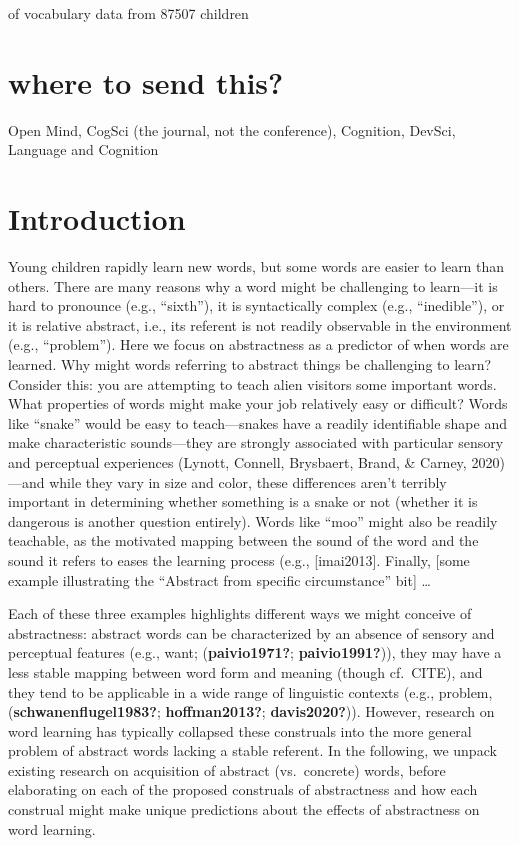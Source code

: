 \documentclass[
  man,floatsintext]{apa6}
\begin{document}
of vocabulary data from 87507 children

\hypertarget{where-to-send-this}{%
\section{where to send this?}\label{where-to-send-this}}

Open Mind, CogSci (the journal, not the conference), Cognition, DevSci, Language and Cognition

\hypertarget{introduction}{%
\section{Introduction}\label{introduction}}

Young children rapidly learn new words, but some words are easier to learn than others. There are many reasons why a word might be challenging to learn---it is hard to pronounce (e.g., ``sixth''), it is syntactically complex (e.g., ``inedible''), or it is relative abstract, i.e., its referent is not readily observable in the environment (e.g., ``problem''). Here we focus on abstractness as a predictor of when words are learned. Why might words referring to abstract things be challenging to learn? Consider this: you are attempting to teach alien visitors some important words. What properties of words might make your job relatively easy or difficult? Words like ``snake'' would be easy to teach---snakes have a readily identifiable shape and make characteristic sounds---they are strongly associated with particular sensory and perceptual experiences (Lynott, Connell, Brysbaert, Brand, \& Carney, 2020)---and while they vary in size and color, these differences aren't terribly important in determining whether something is a snake or not (whether it is dangerous is another question entirely). Words like ``moo'' might also be readily teachable, as the motivated mapping between the sound of the word and the sound it refers to eases the learning process (e.g., {[}imai2013{]}. Finally, {[}some example illustrating the ``Abstract from specific circumstance'' bit{]} \ldots{}

Each of these three examples highlights different ways we might conceive of abstractness: abstract words can be characterized by an absence of sensory and perceptual features (e.g., want; (\textbf{paivio1971?}; \textbf{paivio1991?})), they may have a less stable mapping between word form and meaning (though cf.~CITE), and they tend to be applicable in a wide range of linguistic contexts (e.g., problem, (\textbf{schwanenflugel1983?}; \textbf{hoffman2013?}; \textbf{davis2020?})). However, research on word learning has typically collapsed these construals into the more general problem of abstract words lacking a stable referent. In the following, we unpack existing research on acquisition of abstract (vs.~concrete) words, before elaborating on each of the proposed construals of abstractness and how each construal might make unique predictions about the effects of abstractness on word learning.
\end{document}
